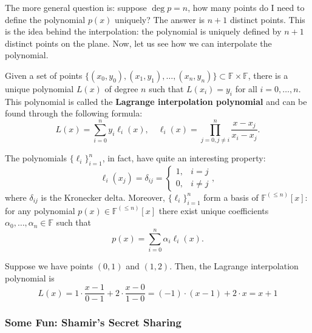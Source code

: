 \documentclass[../lecture-notes.tex]{subfiles}
\begin{document}
The more general question is: suppose $\deg p = n$, how many points do I need to define the polynomial $p(x)$ uniquely? The answer is $n+1$ distinct points. This is the idea behind the interpolation:
the polynomial is uniquely defined by $n+1$ distinct points on the plane. Now, let us see how we can interpolate the polynomial.

\begin{theorem}
    Given a set of points $\{(x_0,y_0),(x_1,y_1),\dots,(x_n,y_n)\} \subset \mathbb{F} \times \mathbb{F}$, there is a unique polynomial $L(x)$ of degree $n$ such that $L(x_i) = y_i$ for all $i=0,\dots,n$. This polynomial is called the \textbf{Lagrange interpolation polynomial} and can be 
    found through the following formula:
    \begin{equation}
        L(x) = \sum_{i=0}^{n} y_i \ell_i(x), \quad \ell_i(x) = \prod_{j=0, j \neq i}^{n} \frac{x-x_j}{x_i-x_j}.
    \end{equation}  
\end{theorem}

\begin{lemma}
    The polynomials $\{\ell_i\}_{i=1}^n$, in fact, have quite an interesting property:
    \begin{equation}
        \ell_i(x_j) = \delta_{ij} = \begin{cases}
            1, & i = j \\ 0, & i \neq j
        \end{cases},
    \end{equation}
    where $\delta_{ij}$ is the Kronecker delta. Moreover, $\{\ell_i\}_{i=1}^n$ form a basis of $\mathbb{F}^{(\leq n)}[x]$: for any polynomial $p(x) \in \mathbb{F}^{(\leq n)}[x]$ there exist unique coefficients $\alpha_0,\dots,\alpha_n \in \mathbb{F}$ such that
    \begin{equation}
        p(x) = \sum_{i=0}^{n} \alpha_i \ell_i(x).
    \end{equation}
\end{lemma}

\begin{example}
    Suppose we have points $(0,1)$ and $(1,2)$. Then, the Lagrange interpolation polynomial is
    \begin{equation}
        L(x) = 1 \cdot \frac{x-1}{0-1} + 2 \cdot \frac{x-0}{1-0} = (-1) \cdot (x-1) + 2 \cdot x = x + 1
    \end{equation}
\end{example}

\subsubsection{Some Fun: Shamir's Secret Sharing}
\end{document}
